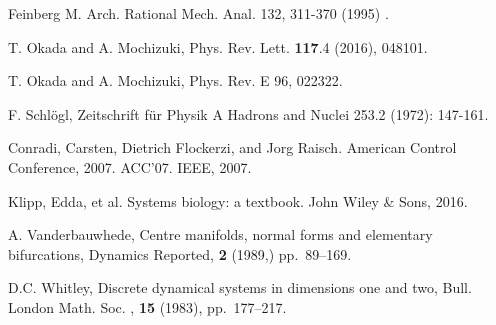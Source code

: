 \documentclass[ amsmath,amssymb,nofootinbib
]{revtex4-1}
\begin{document}
\begin{thebibliography}{99}
Feinberg M. %
Arch. Rational Mech. Anal. 132, 311-370 (1995) .




 T. Okada  and A. Mochizuki,  
Phys. Rev. Lett. {\bf 117}.4 (2016), 048101.


T. Okada and A. Mochizuki,  
Phys. Rev. E 96, 022322.


F. Schl\"ogl,  Zeitschrift f\"ur Physik A Hadrons and Nuclei 253.2 (1972): 147-161.

Conradi, Carsten, Dietrich Flockerzi, and Jorg Raisch. %
American Control Conference, 2007. ACC'07. IEEE, 2007.





Klipp, Edda, et al. Systems biology: a textbook. John Wiley \& Sons, 2016.


	A. Vanderbauwhede,
{ Centre manifolds, normal forms and elementary bifurcations},
Dynamics Reported, {\bf 2} (1989,) pp.~89--169.


	D.C. Whitley,
{ Discrete dynamical systems in dimensions one and two},
Bull. London Math. Soc. , {\bf 15} (1983), pp.~177--217.




\end{thebibliography}
\end{document}
